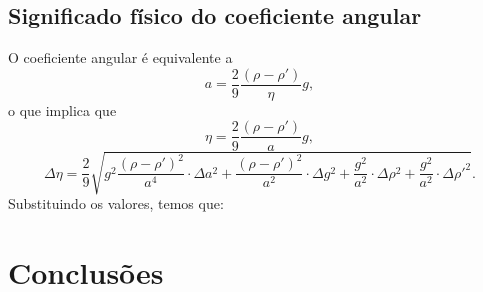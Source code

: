 \documentclass[12pt,a4paper]{article}
\begin{document}
\subsection{Significado físico do coeficiente angular}
O coeficiente angular  é equivalente a
$$a = \frac{2}{9} \frac{(\rho - \rho ')}{\eta}g,$$ 
o que implica que 
$$\eta = \frac{2}{9} \frac{(\rho - \rho ')}{a}g,$$
$$\Delta\eta = \frac{2}{9}\sqrt{g^2\frac{(\rho - \rho ')^2}{a^4} \cdot \Delta a^2 + \frac{(\rho - \rho ')^2}{a^2}\cdot \Delta g^2 + \frac{g^2}{a^2} \cdot \Delta \rho ^2 + \frac{g^2}{a^2} \cdot \Delta \rho '^2}. $$
Substituindo os valores, temos que:



\section{Conclusões}
\end{document}
